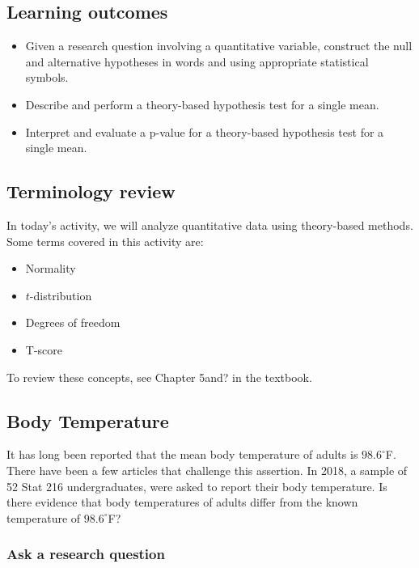 \documentclass[
]{report}
\begin{document}

\subsection{Learning outcomes}\label{learning-outcomes-2}

\begin{itemize}
\item
  Given a research question involving a quantitative variable, construct the null and alternative hypotheses
  in words and using appropriate statistical symbols.
\item
  Describe and perform a theory-based hypothesis test for a single mean.
\item
  Interpret and evaluate a p-value for a theory-based hypothesis test for a single mean.
\end{itemize}

\subsection{Terminology review}\label{terminology-review-2}

In today's activity, we will analyze quantitative data using theory-based methods. Some terms covered in this activity are:

\begin{itemize}
\item
  Normality
\item
  \(t\)-distribution
\item
  Degrees of freedom
\item
  T-score
\end{itemize}

To review these concepts, see Chapter 5and? in the textbook.

\subsection{Body Temperature}\label{body-temperature}

It has long been reported that the mean body temperature of adults is \(98.6^{\circ}\)F. There have been a few articles that challenge this assertion. In 2018, a sample of 52 Stat 216 undergraduates, were asked to report their body temperature. Is there evidence that body temperatures of adults differ from the known temperature of \(98.6^{\circ}\)F?

\subsubsection*{Ask a research question}\label{ask-a-research-question-1}
\end{document}

